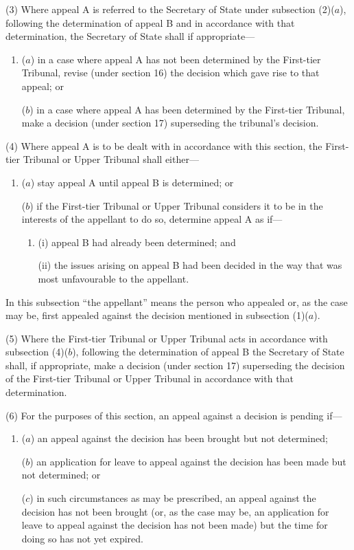 \documentclass[a4paper]{article}
\begin{document}
(3) Where appeal A is referred to the Secretary of State under subsection (2)($a$), following the determination of appeal B and in accordance with that determination, the Secretary of State shall if appropriate---
\begin{enumerate}\item[]
($a$) in a case where appeal A has not been determined by the First-tier Tribunal, revise (under section 16) the decision which gave rise to that appeal; or

($b$) in a case where appeal A has been determined by the First-tier Tribunal, make a decision (under section 17) superseding the tribunal’s decision.
\end{enumerate}

(4) Where appeal A is to be dealt with in accordance with this section, the First-tier Tribunal or Upper Tribunal shall either---
\begin{enumerate}\item[]
($a$) stay appeal A until appeal B is determined; or

($b$) if the First-tier Tribunal or Upper Tribunal considers it to be in the interests of the appellant to do so, determine appeal A as if---
\begin{enumerate}\item[]
(i)
appeal B had already been determined; and

(ii)
the issues arising on appeal B had been decided in the way that was most unfavourable to the appellant.
\end{enumerate}
\end{enumerate}

In this subsection “the appellant” means the person who appealed or, as the case may
be, first appealed against the decision  mentioned in subsection (1)($a$).

(5) Where the First-tier Tribunal or Upper Tribunal acts in accordance with
subsection (4)($b$), following the determination of appeal B the Secretary of State
shall, if appropriate, make a decision (under section 17) superseding the decision of
the First-tier Tribunal or Upper Tribunal in accordance with that determination.

(6) For the purposes of this section, an appeal against a decision is pending if---
\begin{enumerate}\item[]
($a$) an appeal against the decision has been brought but not determined;

($b$) an application for leave to appeal against the decision has been made but
not determined; or

($c$) in such circumstances as may be prescribed, an appeal against the decision
has not been brought (or, as the case may be, an application for leave to
appeal against the decision has not been made) but the time for doing so has
not yet expired.
\end{enumerate}
\end{document}
